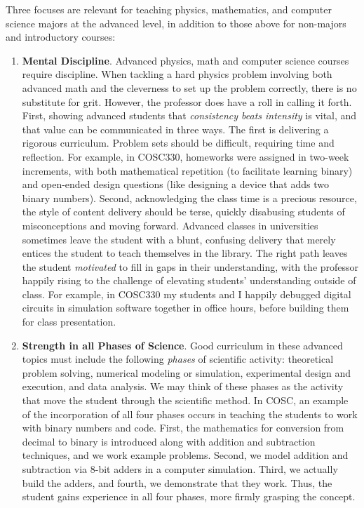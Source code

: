 \documentclass[../../main.tex]{subfiles}
\begin{document}
Three focuses are relevant for teaching physics, mathematics, and computer science majors at the advanced level, in addition to those above for non-majors and introductory courses:
\begin{enumerate}
\item \textbf{Mental Discipline}.  Advanced physics, math and computer science courses require discipline.  When tackling a hard physics problem involving both advanced math and the cleverness to set up the problem correctly, there is no substitute for grit.  However, the professor does have a roll in calling it forth.  First, showing advanced students that \textit{consistency beats intensity} is vital, and that value can be communicated in three ways.  The first is delivering a rigorous curriculum.  Problem sets should be difficult, requiring time and reflection.  For example, in COSC330, homeworks were assigned in two-week increments, with both mathematical repetition (to facilitate learning binary) and open-ended design questions (like designing a device that adds two binary numbers).  Second, acknowledging the class time is a precious resource, the style of content delivery should be terse, quickly disabusing students of misconceptions and moving forward.  Advanced classes in universities sometimes leave the student with a blunt, confusing delivery that merely entices the student to teach themselves in the library.  The right path leaves the student \textit{motivated} to fill in gaps in their understanding, with the professor happily rising to the challenge of elevating students' understanding outside of class.  For example, in COSC330 my students and I happily debugged digital circuits in simulation software together in office hours, before building them for class presentation.

\item \textbf{Strength in all Phases of Science}. Good curriculum in these advanced topics must include the following \textit{phases} of scientific activity: theoretical problem solving, numerical modeling or simulation, experimental design and execution, and data analysis.  We may think of these phases as the activity that move the student through the scientific method.  In COSC, an example of the incorporation of all four phases occurs in teaching the students to work with binary numbers and code.  First, the mathematics for conversion from decimal to binary is introduced along with addition and subtraction techniques, and we work example problems.  Second, we model addition and subtraction via 8-bit adders in a computer simulation.  Third, we actually build the adders, and fourth, we demonstrate that they work.  Thus, the student gains experience in all four phases, more firmly grasping the concept.


\end{enumerate}
\end{document}
